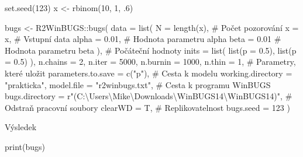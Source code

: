 \documentclass[
  11pt,
  a4paper]{report}
\newenvironment{Shaded}{\begin{snugshade}}{\end{snugshade}}
\newcommand{\AttributeTok}[1]{\textcolor[rgb]{0.40,0.45,0.13}{#1}}
\newcommand{\CommentTok}[1]{\textcolor[rgb]{0.37,0.37,0.37}{#1}}
\newcommand{\DecValTok}[1]{\textcolor[rgb]{0.68,0.00,0.00}{#1}}
\newcommand{\FloatTok}[1]{\textcolor[rgb]{0.68,0.00,0.00}{#1}}
\newcommand{\FunctionTok}[1]{\textcolor[rgb]{0.28,0.35,0.67}{#1}}
\newcommand{\NormalTok}[1]{\textcolor[rgb]{0.00,0.23,0.31}{#1}}
\newcommand{\OtherTok}[1]{\textcolor[rgb]{0.00,0.23,0.31}{#1}}
\newcommand{\SpecialCharTok}[1]{\textcolor[rgb]{0.37,0.37,0.37}{#1}}
\newcommand{\StringTok}[1]{\textcolor[rgb]{0.13,0.47,0.30}{#1}}
\begin{document}
\begin{Shaded}
\begin{Highlighting}[]
\FunctionTok{set.seed}\NormalTok{(}\DecValTok{123}\NormalTok{)}
\NormalTok{x }\OtherTok{\textless{}{-}} \FunctionTok{rbinom}\NormalTok{(}\DecValTok{10}\NormalTok{, }\DecValTok{1}\NormalTok{, .}\DecValTok{6}\NormalTok{)}

\NormalTok{bugs }\OtherTok{\textless{}{-}}\NormalTok{ R2WinBUGS}\SpecialCharTok{::}\FunctionTok{bugs}\NormalTok{(}
    \AttributeTok{data =} \FunctionTok{list}\NormalTok{(}
        \AttributeTok{N     =} \FunctionTok{length}\NormalTok{(x), }\CommentTok{\# Počet pozorování}
        \AttributeTok{x     =}\NormalTok{ x,         }\CommentTok{\# Vstupní data}
        \AttributeTok{alpha =} \FloatTok{0.01}\NormalTok{,      }\CommentTok{\# Hodnota parametru alpha}
        \AttributeTok{beta  =} \FloatTok{0.01}       \CommentTok{\# Hodnota parametru beta}
\NormalTok{    ),}
    \CommentTok{\# Počáteční hodnoty}
    \AttributeTok{inits =} \FunctionTok{list}\NormalTok{(}
        \FunctionTok{list}\NormalTok{(}\AttributeTok{p =} \FloatTok{0.5}\NormalTok{),}
        \FunctionTok{list}\NormalTok{(}\AttributeTok{p =} \FloatTok{0.5}\NormalTok{)}
\NormalTok{    ),}
    \AttributeTok{n.chains =} \DecValTok{2}\NormalTok{, }\AttributeTok{n.iter =} \DecValTok{5000}\NormalTok{, }\AttributeTok{n.burnin =} \DecValTok{1000}\NormalTok{, }\AttributeTok{n.thin =} \DecValTok{1}\NormalTok{,}
    \CommentTok{\# Parametry, které uložit}
    \AttributeTok{parameters.to.save =} \FunctionTok{c}\NormalTok{(}\StringTok{"p"}\NormalTok{),}
    \CommentTok{\# Cesta k modelu}
    \AttributeTok{working.directory =} \StringTok{"prakticka"}\NormalTok{,}
    \AttributeTok{model.file =} \StringTok{"r2winbugs.txt"}\NormalTok{,}
    \CommentTok{\# Cesta k programu WinBUGS}
    \AttributeTok{bugs.directory =}\NormalTok{ r}\StringTok{"(C:\textbackslash{}Users\textbackslash{}Mike\textbackslash{}Downloads\textbackslash{}WinBUGS14\textbackslash{}WinBUGS14)"}\NormalTok{,}
    \CommentTok{\# Odstraň pracovní soubory}
    \AttributeTok{clearWD =}\NormalTok{ T,}
    \CommentTok{\# Replikovatelnost}
    \AttributeTok{bugs.seed =} \DecValTok{123}
\NormalTok{)}
\end{Highlighting}
\end{Shaded}

Výsledek

\begin{Shaded}
\begin{Highlighting}[]
\FunctionTok{print}\NormalTok{(bugs)}
\end{Highlighting}
\end{Shaded}
\end{document}
